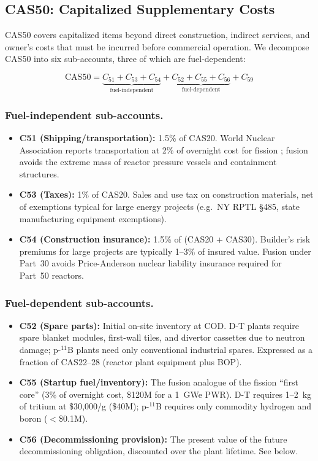 \documentclass{article}
\begin{document}
\subsection{CAS50: Capitalized Supplementary Costs}
\label{sec:cas50}

CAS50 covers capitalized items beyond direct construction, indirect
services, and owner's costs that must be incurred before commercial
operation. We decompose CAS50 into six sub-accounts, three of which
are fuel-dependent:

\begin{equation}
\label{eq:cas50}
\text{CAS50} = \underbrace{C_{51} + C_{53} + C_{54}}_{\text{fuel-independent}}
             + \underbrace{C_{52} + C_{55} + C_{56}}_{\text{fuel-dependent}}
             + C_{59}
\end{equation}

\subsubsection{Fuel-independent sub-accounts.}
\begin{itemize}
\item \textbf{C51 (Shipping/transportation):} 1.5\% of CAS20. World
  Nuclear Association reports transportation at 2\% of overnight
  cost for fission \citep{wna2025}; fusion avoids the extreme mass of
  reactor pressure vessels and containment structures.
\item \textbf{C53 (Taxes):} 1\% of CAS20. Sales and use tax on
  construction materials, net of exemptions typical for large energy
  projects (e.g.\ NY RPTL \S485, state manufacturing equipment exemptions).
\item \textbf{C54 (Construction insurance):} 1.5\% of (CAS20 + CAS30).
  Builder's risk premiums for large projects are typically 1--3\% of
  insured value. Fusion under Part~30 avoids Price-Anderson nuclear
  liability insurance required for Part~50 reactors.
\end{itemize}

\subsubsection{Fuel-dependent sub-accounts.}
\begin{itemize}
\item \textbf{C52 (Spare parts):} Initial on-site inventory at COD.
  D-T plants require spare blanket modules, first-wall tiles, and
  divertor cassettes due to neutron damage; p-${}^{11}$B plants need
  only conventional industrial spares. Expressed as a fraction of
  CAS22--28 (reactor plant equipment plus BOP).
\item \textbf{C55 (Startup fuel/inventory):} The fusion analogue of
  the fission ``first core'' (3\% of overnight cost,
  \$120M for a 1~GWe PWR). D-T requires 1--2~kg of tritium at
  \$30{,}000/g (\$40M); p-${}^{11}$B requires only
  commodity hydrogen and boron ($<$\$0.1M).
\item \textbf{C56 (Decommissioning provision):} The present value of
  the future decommissioning obligation, discounted over the plant
  lifetime. See below.
\end{itemize}
\end{document}
